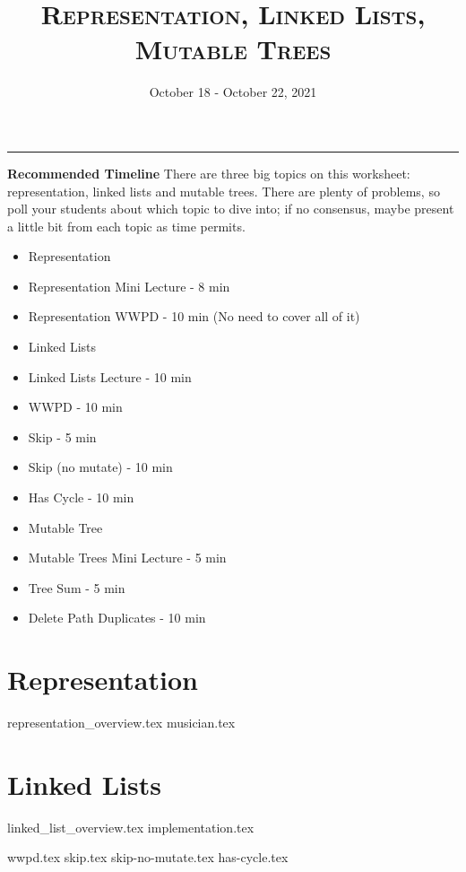 \documentclass{exam}
\title{\textsc{Representation, Linked Lists, Mutable Trees}}
\date{October 18 - October 22, 2021}
\begin{document}
\maketitle
\rule{\textwidth}{0.15em}
\fontsize{12}{15}\selectfont

\begin{guide}
\textbf{Recommended Timeline}
\newline
There are three big topics on this worksheet: representation, linked lists and mutable trees. There are plenty of problems,
so poll your students about which topic to dive into; if no consensus, maybe present a little bit from each topic as time permits.
    \begin{itemize}
        \item Representation
            \item Representation Mini Lecture - 8 min
            \item Representation WWPD - 10 min (No need to cover all of it)
        \item Linked Lists
            \item Linked Lists Lecture - 10 min
            \item WWPD - 10 min
            \item Skip - 5 min
            \item Skip (no mutate) - 10 min
            \item Has Cycle - 10 min
        \item Mutable Tree
            \item Mutable Trees Mini Lecture - 5 min
            \item Tree Sum - 5 min
            \item Delete Path Duplicates - 10 min
    \end{itemize}
\vspace{.5cm}
\end{guide}

\section{Representation}
\begin{questions}
{representation_overview.tex}
{musician.tex}
\end{questions}

\newpage
\section{Linked Lists}
{linked_list_overview.tex}
{implementation.tex}
\begin{questions}
{wwpd.tex}
{skip.tex}
{skip-no-mutate.tex}
{has-cycle.tex}
\end{questions}
\end{document}
